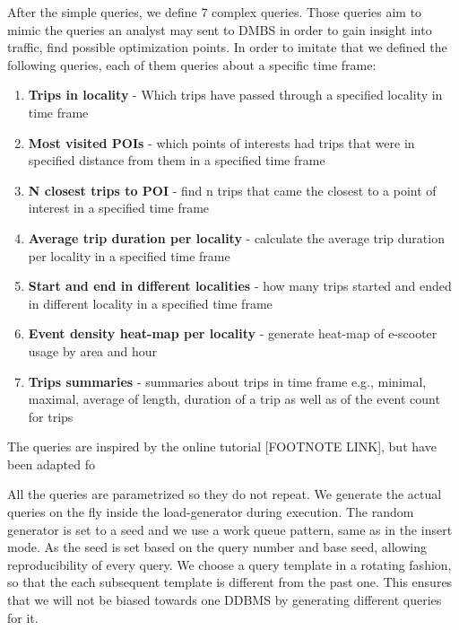 After the simple queries, we define 7 complex queries.
Those queries aim to mimic the queries an analyst may sent to DMBS in order to gain insight into traffic, find possible optimization points.
In order to imitate that we defined the following queries, each of them queries about a specific time frame:
\begin{enumerate}
	\item \textbf{Trips in locality} - Which trips have passed through a specified locality in time frame
	\item \textbf{Most visited POIs} - which points of interests had trips that were in specified distance from them in a specified time frame
	\item \textbf{N closest trips to POI} - find n trips that came the closest to a point of interest in a specified time frame
	\item \textbf{Average trip duration per locality} - calculate the average trip duration per locality in a specified time frame
	\item \textbf{Start and end in different localities} - how many trips started and ended in different locality in a specified time frame
	\item \textbf{Event density heat-map per locality} - generate heat-map of e-scooter usage by area and hour
	\item \textbf{Trips summaries} - summaries about trips in time frame e.g., minimal, maximal, average of length, duration of a trip as well as of the event count for trips
\end{enumerate}

The queries are inspired by the online tutorial [FOOTNOTE LINK], but have been adapted fo

All the queries are parametrized so they do not repeat.
We generate the actual queries on the fly inside the load-generator during execution. 
The random generator is set to a seed and we use a work queue pattern, same as in the insert mode.
As the seed is set based on the query number and base seed, allowing reproducibility of every query.
We choose a query template in a rotating fashion, so that the each subsequent template is different from the past one.
This ensures that we will not be biased towards one DDBMS by generating different queries for it.


